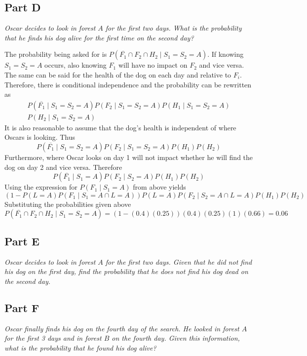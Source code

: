 \documentclass{article}
\begin{document}
\subsection*{Part D}

\textit{Oscar decides to look in forest $ A $ for the first two days. What is
the probability that he finds his dog alive for the first time on the second
day?}

\bigbreak

The probability being asked for is $ P ( \overline{F_1} \cap F_2 \cap H_2 \mid
S_1 = S_2 = A) $. If knowing $ S_1 = S_2 = A $ occurs, also knowing $ F_1 $ will
have no impact on $ F_2 $ and vice versa. The same can be said for the health of
the dog on each day and relative to $ F_i $. Therefore, there is conditional
independence and the probability can be rewritten as
\begin{align*}
    P(\overline{F_1} \mid S_1 = S_2 = A) P(F_2 \mid S_1 = S_2 = A) P(H_1 \mid
    S_1 = S_2 = A) \\
    P(H_2 \mid S_1 = S_2 = A)
\end{align*}
It is also reasonable to assume that the dog's health is independent of where
Oscars is looking. Thus
$$ P(\overline{F_1} \mid S_1 = S_2 = A) P(F_2 \mid S_1 = S_2 = A) P(H_1) P(H_2)
$$
Furthermore, where Oscar looks on day 1 will not impact whether he will find the
dog on day 2 and vice versa. Therefore
$$ P(\overline{F_1} \mid S_1 = A) P(F_2 \mid S_2 = A) P(H_1) P(H_2) $$
Using the expression for $ P(F_1 \mid S_1 = A) $ from above yields
$$ (1 - P(L = A)P(F_1 \mid S_1 = A \cap L = A)) P(L = A) P(F_2 \mid S_2 = A \cap
L = A) P(H_1) P(H_2) $$
Substituting the probabilities given above
$$ P ( \overline{F_1} \cap F_2 \cap H_2 \mid S_1 = S_2 = A) = (1 -
(0.4)(0.25))(0.4)(0.25)(1)(0.66) = 0.06 $$

\subsection*{Part E}

\textit{Oscar decides to look in forest $ A $ for the first two days. Given that
he did not find his dog on the first day, find the probability that he does not
find his dog dead on the second day.}

\subsection*{Part F}

\textit{Oscar finally finds his dog on the fourth day of the search. He looked
in forest $ A $ for the first 3 days and in forest $ B $ on the fourth day.
Given this information, what is the probability that he found his dog alive?}
\end{document}
